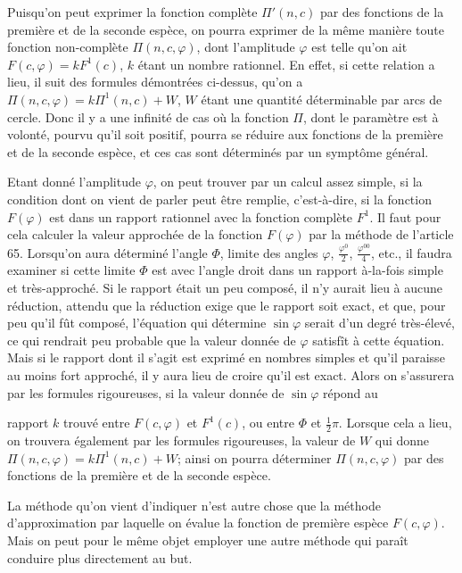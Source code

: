 \documentclass{article}
\begin{document}
Puisqu'on peut exprimer la fonction complète $\Pi'(n,c)$ par des fonctions de la première et de la seconde espèce, on pourra exprimer de la même manière toute fonction non-complète $\Pi(n,c,\varphi)$, dont l'amplitude $\varphi$ est telle qu'on ait $F(c,\varphi)=kF^{1}(c)$, $k$ étant un nombre rationnel. En effet, si cette relation a lieu, il suit des formules démontrées ci-dessus, qu'on a $\Pi(n,c,\varphi)=k\Pi^{1}(n,c)+W$, $W$ étant une quantité déterminable par arcs de cercle. Donc il y a une infinité de cas où la fonction $\Pi$, dont le paramètre est à volonté, pourvu qu'il soit positif, pourra se réduire aux fonctions de la première et de la seconde espèce, et ces cas sont déterminés par un symptôme général.

Etant donné l'amplitude $\varphi$, on peut trouver par un calcul assez simple, si la condition dont on vient de parler peut être remplie, c'est-à-dire, si la fonction $F(\varphi)$ est dans un rapport rationnel avec la fonction complète $F^{1}$. Il faut pour cela calculer la valeur approchée de la fonction $F(\varphi)$ par la méthode de l'article 65. Lorsqu'on aura déterminé l'angle $\Phi$, limite des angles $\varphi$, $\frac{\varphi^{0}}{2}$, $\frac{\varphi^{00}}{4}$, etc., il faudra examiner si cette limite $\Phi$ est avec l'angle droit dans un rapport à-la-fois simple et très-approché. Si le rapport était un peu composé, il n'y aurait lieu à aucune réduction, attendu que la réduction exige que le rapport soit exact, et que, pour peu qu'il fût composé, l'équation qui détermine $\sin\varphi$ serait d'un degré très-élevé, ce qui rendrait peu probable que la valeur donnée de $\varphi$ satisfît à cette équation. Mais si le rapport dont il s'agit est exprimé en nombres simples et qu'il paraisse au moins fort approché, il y aura lieu de croire qu'il est exact. Alors on s'assurera par les formules rigoureuses, si la valeur donnée de $\sin\varphi$ répond au

rapport $k$ trouvé entre $F(c,\varphi)$ et $F^{1}(c)$, ou entre $\Phi$ et $\tfrac{1}{2}\pi$. Lorsque cela a lieu, on trouvera également par les formules rigoureuses, la valeur de $W$ qui donne $\Pi(n,c,\varphi)=k\Pi^{1}(n,c)+W$; ainsi on pourra déterminer $\Pi(n,c,\varphi)$ par des fonctions de la première et de la seconde espèce.

La méthode qu'on vient d'indiquer n'est autre chose que la méthode d'approximation par laquelle on évalue la fonction de première espèce $F(c,\varphi)$. Mais on peut pour le même objet employer une autre méthode qui paraît conduire plus directement au but.
\end{document}
